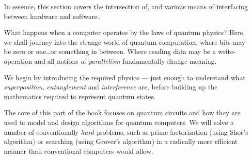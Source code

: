 \begin{itemize}
  In essence, this section covers the intersection of, and various means of
  interfacing between hardware and software.

  What happens when a computer operates by the laws of quantum physics?
  Here, we shall journey into the strange world of quantum computation, where
  bits may be zero or one\dots or something in between.
  Where reading data may be a write-operation and all notions of
  \emph{parallelism} fundamentally change meaning.

  We begin by introducing the required physics --- just enough to understand
  what \emph{superposition}, \emph{entanglement} and \emph{interference} are,
  before building up the mathematics required to represent quantum states.

  The core of this part of the book focuses on quantum circuits and how they
  are used to model and design algorithms for quantum computers. We will solve
  a number of conventionally \emph{hard} problems, such as prime factorization
  (using Shor's algorithm) or searching (using Grover's algorithm) in a
  radically more efficient manner than conventional computers would allow.
\end{itemize}

